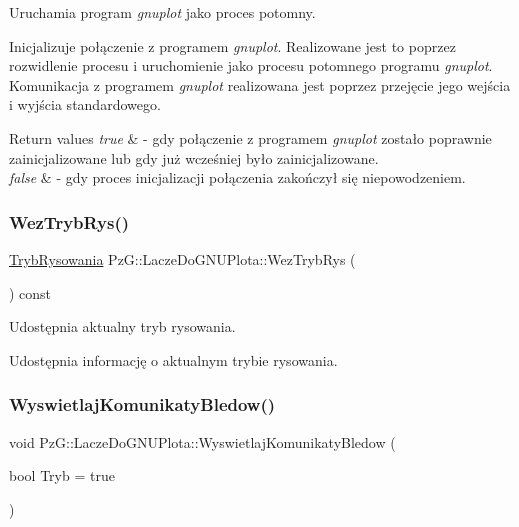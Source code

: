 Uruchamia program {\itshape gnuplot} jako proces potomny. 

Inicjalizuje połączenie z programem {\itshape gnuplot}. Realizowane jest to poprzez rozwidlenie procesu i uruchomienie jako procesu potomnego programu {\itshape gnuplot}. Komunikacja z programem {\itshape gnuplot} realizowana jest poprzez przejęcie jego wejścia i wyjścia standardowego.


\begin{DoxyRetVals}{Return values}
{\em true} & -\/ gdy połączenie z programem {\itshape gnuplot} zostało poprawnie zainicjalizowane lub gdy już wcześniej było zainicjalizowane. \\
\hline
{\em false} & -\/ gdy proces inicjalizacji połączenia zakończył się niepowodzeniem. \\
\hline
\end{DoxyRetVals}
\mbox{\label{classPzG_1_1LaczeDoGNUPlota_a7c417f27b4b112f58a5be3ce6ea8d1fe}} 
\subsubsection{\texorpdfstring{Wez\+Tryb\+Rys()}{WezTrybRys()}}
{\footnotesize\ttfamily \hyperlink{namespacePzG_aeedae1ef10c66d720f9e89de408ca4ca}{Tryb\+Rysowania} Pz\+G\+::\+Lacze\+Do\+G\+N\+U\+Plota\+::\+Wez\+Tryb\+Rys (\begin{DoxyParamCaption}{ }\end{DoxyParamCaption}) const\hspace{0.3cm}{\ttfamily [inline]}}



Udostępnia aktualny tryb rysowania. 

Udostępnia informację o aktualnym trybie rysowania. \mbox{\label{classPzG_1_1LaczeDoGNUPlota_a4531e6d166faf2e2c8bb4a54a9c9e1f8}} 
\subsubsection{\texorpdfstring{Wyswietlaj\+Komunikaty\+Bledow()}{WyswietlajKomunikatyBledow()}}
{\footnotesize\ttfamily void Pz\+G\+::\+Lacze\+Do\+G\+N\+U\+Plota\+::\+Wyswietlaj\+Komunikaty\+Bledow (\begin{DoxyParamCaption}\item[{bool}]{Tryb = {\ttfamily true} }\end{DoxyParamCaption})}



